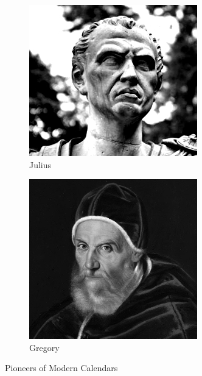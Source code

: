 \documentclass{article}
\begin{document}
\begin{figure}[htbp]
    \centering
    \begin{subfigure}{0.35\textwidth}
        \centering
        \includegraphics[width=\textwidth]{images/julius.jpg}
        \caption{Julius}
    \end{subfigure}
    \begin{subfigure}{0.35\textwidth}
        \centering
        \includegraphics[width=.94\textwidth]{images/gregory.PNG}
        \caption{Gregory}
    \end{subfigure}
    \caption{Pioneers of Modern Calendars}
\end{figure}
\end{document}
